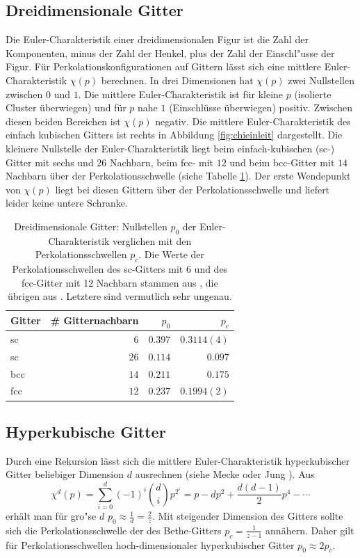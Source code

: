 \subsection{Dreidimensionale Gitter}
Die Euler-Charakteristik einer dreidimensionalen Figur ist die Zahl der Komponenten, minus der Zahl der Henkel, plus der Zahl der Einschl"usse der Figur. F\"ur Perkolationskonfigurationen auf Gittern l\"asst sich eine mittlere Euler-Charakteristik $\chi(p)$ berechnen. In drei Dimensionen hat $\chi(p)$ zwei Nullstellen zwischen $0$ und $1$. Die mittlere Euler-Charakteristik ist f\"ur kleine $p$ (isolierte Cluster \"uberwiegen) und f\"ur $p$ nahe $1$ (Einschl\"usse \"uberwiegen) positiv. Zwischen diesen beiden Bereichen ist $\chi(p)$ negativ. Die mittlere Euler-Charakteristik des einfach kubischen Gitters ist rechts in Abbildung \ref{fig:chieinleit} dargestellt. Die kleinere Nullstelle der Euler-Charakteristik liegt beim einfach-kubischen (sc-) Gitter mit sechs und $26$ Nachbarn, beim fcc- mit $12$ und beim bcc-Gitter mit $14$ Nachbarn \"uber der Perkolationsschwelle (siehe Tabelle \ref{tab:3Dknown}). Der erste Wendepunkt von $\chi(p)$ liegt bei diesen Gittern \"uber der Perkolationsschwelle und liefert leider keine untere Schranke. 
\begin{table}[btp]
  \centering
  \begin{tabular}{|l|r|r||r|}
    \hline
    Gitter & \# Gitternachbarn &$p_0$ & $p_c$ \\ \hline
    sc & $6$  &$ 0.397 $& $0.3114(4)$ \\ \hline 
    sc & $26$ &$ 0.114 $& $0.097$  \\ \hline 
    bcc & $14$  &$ 0.211 $& $0.175$ \\ \hline 
    fcc & $12$  &$ 0.237 $& $0.1994(2)$ \\ \hline 

  \end{tabular}
  \caption{Dreidimensionale Gitter: Nullstellen $p_0$ der Euler-Charakteristik verglichen mit den Perkolationsschwellen $p_c$. Die Werte der Perkolationsschwellen des sc-Gitters mit 6 und des fcc-Gitter mit 12 Nachbarn stammen aus \cite{Marck:97}, die \"ubrigen aus \cite{Essam:72}. Letztere sind vermutlich sehr ungenau.}
  \label{tab:3Dknown}
\end{table}

\subsection{Hyperkubische Gitter}
Durch eine Rekursion l\"asst sich die mittlere Euler-Charakteristik hyperkubischer Gitter beliebiger Dimension $d$ ausrechnen (siehe Mecke \cite{Mecke:94} oder Jung \cite{Jung:00}). Aus
\begin{equation}
  \chi^d(p)=\sum_{i=0}^d (-1)^i{ d \choose i} p^{2^i}=p-dp^2+\frac{d(d-1)}{2}p^4-\cdots
\end{equation}
erh\"alt man f\"ur gro"se $d$ $p_0 \approx \frac{1}{d} =\frac{2}{z}$. Mit steigender Dimension des Gitters sollte sich die Perkolationsschwelle der des Bethe-Gitters $p_c=\frac{1}{z-1}$ ann\"ahern. Daher gilt f\"ur Perkolationsschwellen hoch-dimensionaler hyperkubischer Gitter $p_0\approx 2p_c$.


